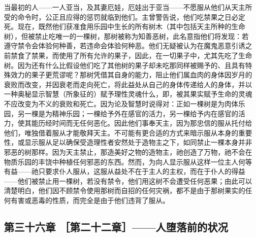 当最初的人——一人亚当，及其妻厄娃，厄娃出于亚当——不愿服从他们从天主所受的命令时，公正且应得的惩罚就临到他们。主曾警告说，他们吃禁果之日必定死。现在，既然他们获准食用乐园中生长的所有树木（其中包括天主所种的生命树），但被禁止吃唯一的一棵树，那树被称为知善恶树，此名意指他们将发现：若遵守禁令会体验何种善，若违命会体验何种恶。他们无疑被认为在魔鬼恶意引诱之前禁食了禁果，而使用了所有允许的果子，因此，在一切果子中，尤其先吃了生命树。因为还有什么比假设他们吃了其他树的果子却未吃那同样被赐予的、且具有特殊效力的果子更荒谬呢？那树凭借其自身的能力，阻止他们属血肉的身体因岁月的衰败而改变，并因衰老而走向死亡，将此益处从自己的身体传递给人的身体，并以一种奥秘显示智慧（所象征的）赋予理性灵魂什么，即，被其果实赋予生命的灵魂不应改变为不义的衰败和死亡。因为论及智慧时说得对：正如一棵树是为肉体乐园，另一棵是为精神乐园；一棵给予外在感官的活力，另一棵给予内在感官的活力，使其能历经时间而无任何恶化。因此他们事奉天主，因为那忠信的服从托付给他们，唯独借着服从才能敬拜天主。不可能有更合适的方式来暗示服从本身的重要性，或显示服从足以确保受造理性者安然处于造物主之下，如同禁止一棵本身并非邪恶的树那样。因为天主禁止，那造美好之物的造物主，祂创造了万物，祂不会在物质乐园的丰饶中种植任何邪恶的东西。然而，为向人显示服从这样一位主人何等有益——祂只要求仆人服从，这服从益处不在于主人的主权，而在于仆人的得益——他们被禁止用一棵树，若没有禁令，他们用这树不会遭受任何恶果；由此可以清楚明白，他们因不顾禁令使用那树而自招的任何灾祸，都不是由于那树果实的任何有害或恶毒的性质，而完全是由于他们违背了服从。\par


\subsection{第三十六章 ［第二十二章］——人堕落前的状况}


